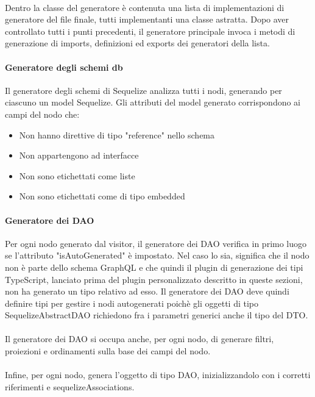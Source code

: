 \documentclass[a4paper, 12pt]{report}
\begin{document}
      \paragraph*{}
      Dentro la classe del generatore è contenuta una lista di implementazioni di generatore del file finale, tutti implementanti una classe astratta.
      Dopo aver controllato tutti i punti precedenti, il generatore principale invoca i metodi di generazione di imports, definizioni ed exports dei generatori della lista.
      \paragraph*{Generatore degli schemi db}
      Il generatore degli schemi di Sequelize analizza tutti i nodi, generando per ciascuno un model Sequelize.
      Gli attributi del model generato corrispondono ai campi del nodo che:
      \begin{itemize}
        \item Non hanno direttive di tipo "reference" nello schema
        \item Non appartengono ad interfacce
        \item Non sono etichettati come liste
        \item Non sono etichettati come di tipo embedded
      \end{itemize}
      \paragraph*{Generatore dei DAO}
      Per ogni nodo generato dal visitor, il generatore dei DAO verifica in primo luogo se l'attributo "isAutoGenerated" è impostato.
      Nel caso lo sia, significa che il nodo non è parte dello schema GraphQL e che quindi il plugin di generazione dei tipi TypeScript, lanciato prima del plugin personalizzato descritto in queste sezioni, non ha generato un tipo relativo ad esso.
      Il generatore dei DAO deve quindi definire tipi per gestire i nodi autogenerati poichè gli oggetti di tipo SequelizeAbstractDAO richiedono fra i parametri generici anche il tipo del DTO.
      \paragraph*{}
      Il generatore dei DAO si occupa anche, per ogni nodo, di generare filtri, proiezioni e ordinamenti sulla base dei campi del nodo.
      \paragraph*{}
      Infine, per ogni nodo, genera l'oggetto di tipo DAO, inizializzandolo con i corretti riferimenti e sequelizeAssociations.
\end{document}
